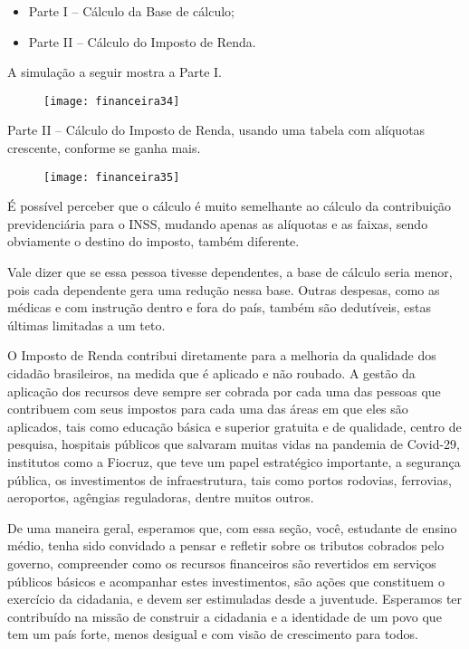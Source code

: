 \begin{itemize}
  \item Parte I -- Cálculo da Base de cálculo;
  \item Parte II -- Cálculo do Imposto de Renda.
\end{itemize}

A simulação a seguir mostra a Parte I.

\begin{figure}[H]
\centering

\texttt{[image: financeira34]}
\end{figure}

\clearpage
Parte II -- Cálculo do Imposto de Renda, usando uma tabela com alíquotas crescente, conforme se ganha mais.

\begin{figure}[H]
\centering

\texttt{[image: financeira35]}
\end{figure}

É possível perceber que o cálculo é muito semelhante ao cálculo da contribuição previdenciária para o INSS, mudando apenas as alíquotas e as faixas, sendo obviamente o destino do imposto, também diferente.

Vale dizer que se essa pessoa tivesse dependentes, a base de cálculo seria menor, pois cada dependente gera uma redução nessa base. Outras despesas, como as médicas e com instrução dentro e fora do país, também são dedutíveis, estas últimas limitadas a um teto.

O Imposto de Renda contribui diretamente para a melhoria da qualidade dos cidadão brasileiros, na medida que é aplicado e não roubado. A gestão da aplicação dos recursos deve sempre ser cobrada por cada uma das pessoas que contribuem com seus impostos para cada uma das áreas em que eles são aplicados, tais como educação básica e superior gratuita e de qualidade, centro de pesquisa, hospitais públicos que salvaram muitas vidas na pandemia de Covid-29, institutos como a Fiocruz, que teve um papel estratégico importante, a segurança pública, os investimentos de infraestrutura, tais como portos rodovias, ferrovias, aeroportos, agêngias reguladoras, dentre muitos outros.

De uma maneira geral, esperamos que, com essa seção, você, estudante de ensino médio, tenha sido convidado a pensar e refletir sobre os tributos cobrados pelo governo, compreender como os recursos financeiros são revertidos em serviços públicos básicos e acompanhar estes investimentos, são ações que constituem o exercício da cidadania, e devem ser  estimuladas desde a juventude. Esperamos ter contribuído na missão de construir a cidadania e a identidade de um povo que tem um país forte, menos desigual e com visão de crescimento para todos.

